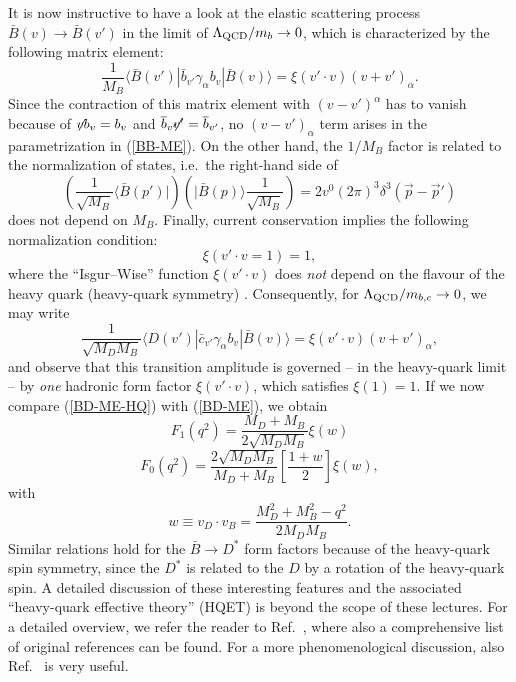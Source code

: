 \documentclass[12pt]{article}
\begin{document}
It is now instructive to have a look at the elastic scattering process 
$\bar B(v)\to \bar B(v')$ in the limit of $\Lambda_{\rm QCD}/m_b \to 0$, 
which is characterized by the following matrix element:
\begin{equation}\label{BB-ME}
\frac{1}{M_B}\langle\bar B(v')|\bar b_{v'}\gamma_\alpha b_v
|\bar B(v)\rangle=\xi(v'\cdot v)(v+v')_\alpha.
\end{equation}
Since the contraction of this matrix element with $(v-v')^\alpha$ has to 
vanish because of $\not \hspace*{-0.1truecm}v b_v= b_v$ and 
$\overline{b}_{v'} \hspace*{-0.2truecm}\not \hspace*{-0.1truecm}v' = 
\overline{b}_{v'}$, no $(v-v')_\alpha$ term arises in the parametrization
in (\ref{BB-ME}). On the other hand, the $1/M_B$ factor is related
to the normalization of states, i.e.\ the right-hand side of
\begin{equation}
\left(\frac{1}{\sqrt{M_B}}\langle\bar B(p')|\right)
\left(|\bar B(p)\rangle\frac{1}{\sqrt{M_B}}\right)=2v^0(2\pi)^3
\delta^3(\vec p-\vec p')
\end{equation}
does not depend on $M_B$. Finally, current conservation implies 
the following normalization condition:
\begin{equation}
\xi(v'\cdot v=1)=1,
\end{equation}
where  the ``Isgur--Wise'' function $\xi(v'\cdot v)$ does 
{\it not} depend on the flavour of the heavy quark (heavy-quark symmetry)
\cite{IW}. Consequently, for $\Lambda_{\rm QCD}/m_{b,c}\to 0$, we may write
\begin{equation}\label{BD-ME-HQ}
\frac{1}{\sqrt{M_D M_B}}\langle D(v')|\bar c_{v'}\gamma_\alpha b_v
|\bar B(v)\rangle=\xi(v'\cdot v)(v+v')_\alpha,
\end{equation}
and observe that this transition amplitude is governed -- in the 
heavy-quark limit -- by {\it one} hadronic form factor $\xi(v'\cdot v)$, 
which satisfies $\xi(1)=1$. If we now compare (\ref{BD-ME-HQ})
with (\ref{BD-ME}), we obtain 
\begin{equation}
F_1(q^2)=\frac{M_D+M_B}{2\sqrt{M_DM_B}}\xi(w)
\end{equation}
\begin{equation}
F_0(q^2)=\frac{2\sqrt{M_DM_B}}{M_D+M_B}\left[\frac{1+w}{2}\right]\xi(w),
\end{equation}
with
\begin{equation}
w\equiv v_D\cdot v_B=\frac{M_D^2+M_B^2-q^2}{2M_DM_B}.
\end{equation}
Similar relations hold  for the $\bar B\to D^\ast$ form factors
because of the heavy-quark spin symmetry, since the $D^\ast$ is 
related to the $D$ by a rotation of the heavy-quark spin. A detailed 
discussion of these interesting features and the associated ``heavy-quark 
effective theory'' (HQET) is beyond the scope of these lectures. For
a detailed overview, we refer the reader to Ref.~\cite{neubert-rev}, where
also a comprehensive list of original references can be found. 
For a more phenomenological discussion, also Ref.~\cite{BaBar-book} is very
useful. 
\end{document}

